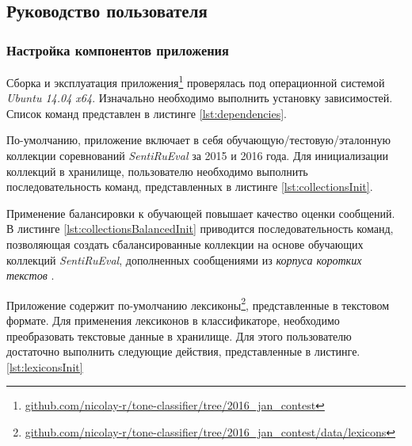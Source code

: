 \subsection{Руководство пользователя}
    \subsubsection{Настройка компонентов приложения}
    Сборка и эксплуатация приложения\footnote{ \url{github.com/nicolay-r/tone-classifier/tree/2016_jan_contest}
    }
    проверялась под операционной системой
    {\it Ubuntu 14.04 x64}.
    Изначально необходимо выполнить установку зависимостей.
    Список команд представлен в листинге \ref{lst:dependencies}.
    \lstset{style=bash}
    

        По-умолчанию, приложение включает в себя обучающую/тестовую/эталонную
        коллекции соревнований {\it SentiRuEval} за 2015 и 2016 года. Для
        инициализации коллекций в хранилище, пользователю необходимо выполнить
        последовательность команд, представленных в листинге \ref{lst:collectionsInit}.
        \lstset{style=bash}
        

        Применение балансировки к обучающей повышает качество оценки сообщений.
        \cite{diploma2015} В листинге \ref{lst:collectionsBalancedInit} приводится
        последовательность команд, позволяющая создать сбалансированные коллекции
        на основе обучающих коллекций {\it SentiRuEval}, дополненных сообщениями
        из {\it корпуса коротких текстов} \cite{rubtsovaCollection}.
        \lstset{style=bash}
        

        Приложение содержит по-умолчанию лексиконы\footnote{
            \url{github.com/nicolay-r/tone-classifier/tree/2016_jan_contest/data/lexicons}
	}, представленные в текстовом
        формате. Для применения лексиконов в классификаторе, необходимо преобразовать
        текстовые данные в хранилище. Для этого пользователю
        достаточно выполнить следующие действия, представленные в листинге.
        \ref{lst:lexiconsInit}
        \lstset{style=bash}
        


